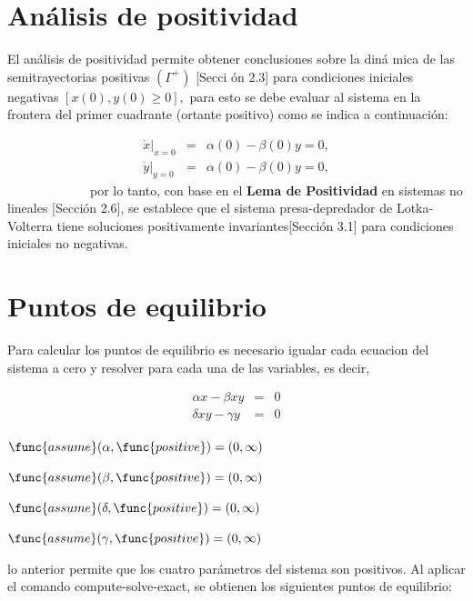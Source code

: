\documentclass[letterpaper,11pt]{article}
\begin{document}
\bigskip

\section{An\'{a}lisis de positividad}

El an\'{a}lisis de positividad permite obtener conclusiones sobre la din\'{a}%
mica de las semitrayectorias positivas $\left( \Gamma ^{+}\right) $ [Secci%
\'{o}n 2.3] para condiciones iniciales negativas $\left[ x\left( 0\right)
,y\left( 0\right) \geq 0\right] ,$ para esto se debe evaluar al sistema en
la frontera del primer cuadrante (ortante positivo) como se indica a
continuaci\'{o}n:\ 

\begin{eqnarray*}
\left. \dot{x}\right\vert _{x=0} &=&\alpha (0)-\beta (0)y=0, \\
\left. \dot{y}\right\vert _{y=0} &=&\alpha (0)-\beta (0)y=0,
\end{eqnarray*}
\ \ \ \ \ \ \ \ \ \ \ \ \ por lo tanto, con base en el \textbf{Lema de
Positividad }en sistemas no lineales [Secci\'{o}n 2.6], se establece que el
sistema presa-depredador de Lotka-Volterra tiene soluciones positivamente
invariantes[Secci\'{o}n 3.1] para condiciones iniciales no negativas.

\section{Puntos de equilibrio}

Para calcular los puntos de equilibrio es necesario igualar cada ecuacion
del sistema a cero y resolver para cada una de las variables, es decir,

\begin{eqnarray*}
\alpha x-\beta xy &=&0 \\
\delta xy-\gamma y &=&0
\end{eqnarray*}

$\func{assume}(\alpha ,\func{positive})=\allowbreak \left( 0,\infty \right) $

$\func{assume}(\beta ,\func{positive})=\allowbreak \left( 0,\infty \right) $

$\func{assume}(\delta ,\func{positive})=\allowbreak \left( 0,\infty \right) $

$\func{assume}(\gamma ,\func{positive})=\allowbreak \left( 0,\infty \right) $

lo anterior permite que los cuatro par\'{a}metros del sistema son positivos.
Al aplicar el comando compute-solve-exact, se obtienen los siguientes puntos
de equilibrio:\ 
\end{document}
